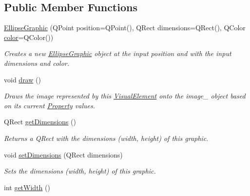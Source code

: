 \subsection*{Public Member Functions}
\begin{DoxyCompactItemize}
\item 
\hyperlink{class_picto_1_1_ellipse_graphic_a4e5623699a53ec0c4e8b83685ca53504}{Ellipse\-Graphic} (Q\-Point position=Q\-Point(), Q\-Rect dimensions=Q\-Rect(), Q\-Color \hyperlink{struct_picto_1_1_visual_element_a45c3042c969717eb2ab60373369c7de7}{color}=Q\-Color())
\begin{DoxyCompactList}\small\item\em Creates a new \hyperlink{class_picto_1_1_ellipse_graphic}{Ellipse\-Graphic} object at the input position and with the input dimensions and color. \end{DoxyCompactList}\item 
\hypertarget{class_picto_1_1_ellipse_graphic_a415fbe89e03a2aec8ecb058bd81a12a9}{void \hyperlink{class_picto_1_1_ellipse_graphic_a415fbe89e03a2aec8ecb058bd81a12a9}{draw} ()}\label{class_picto_1_1_ellipse_graphic_a415fbe89e03a2aec8ecb058bd81a12a9}

\begin{DoxyCompactList}\small\item\em Draws the image represented by this \hyperlink{struct_picto_1_1_visual_element}{Visual\-Element} onto the image\-\_\- object based on its current \hyperlink{class_picto_1_1_property}{Property} values. \end{DoxyCompactList}\item 
Q\-Rect \hyperlink{class_picto_1_1_ellipse_graphic_a1f5fb71e288ae35d8bd58996e0ed4e9e}{get\-Dimensions} ()
\begin{DoxyCompactList}\small\item\em Returns a Q\-Rect with the dimensions (width, height) of this graphic. \end{DoxyCompactList}\item 
void \hyperlink{class_picto_1_1_ellipse_graphic_a057e6a832f63e47fe5e7a1ca5d69ba94}{set\-Dimensions} (Q\-Rect dimensions)
\begin{DoxyCompactList}\small\item\em Sets the dimensions (width, height) of this graphic. \end{DoxyCompactList}\item 
\hypertarget{class_picto_1_1_ellipse_graphic_a4ed13d3c7dafb92ed653317b2a99b130}{int \hyperlink{class_picto_1_1_ellipse_graphic_a4ed13d3c7dafb92ed653317b2a99b130}{get\-Width} ()}\label{class_picto_1_1_ellipse_graphic_a4ed13d3c7dafb92ed653317b2a99b130}


\end{DoxyCompactItemize}
